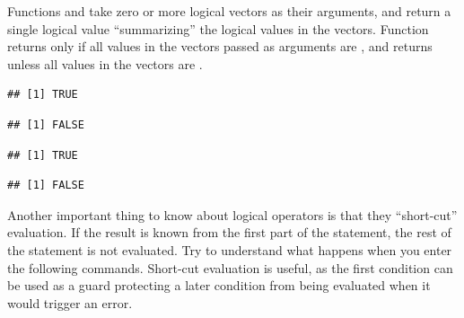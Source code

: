 \documentclass[krantz2]{krantz}\usepackage{knitr}
\begin{document}
Functions  and  take zero or more logical vectors as their arguments, and return a single logical value ``summarizing'' the logical values in the vectors. Function  returns  only if all values in the vectors passed as arguments are , and  returns  unless all values in the vectors are .

\begin{knitrout}\footnotesize
{}\color{fgcolor}\begin{kframe}
\begin{alltt}
\end{alltt}
\begin{verbatim}
## [1] TRUE
\end{verbatim}
\begin{alltt}
\end{alltt}
\begin{verbatim}
## [1] FALSE
\end{verbatim}
\begin{alltt}
 \hlopt{&} 
\end{alltt}
\begin{verbatim}
## [1] TRUE
\end{verbatim}
\begin{alltt}
 \hlopt{&} 
\end{alltt}
\begin{verbatim}
## [1] FALSE
\end{verbatim}
\end{kframe}
\end{knitrout}

Another important thing to know about logical operators is that they ``short-cut'' evaluation. If the result is known from the first part of the statement, the rest of the statement is not evaluated. Try to understand what happens when you enter the following commands. Short-cut evaluation is useful, as the first condition can be used as a guard protecting a later condition from being evaluated when it would trigger an error.
\end{document}
